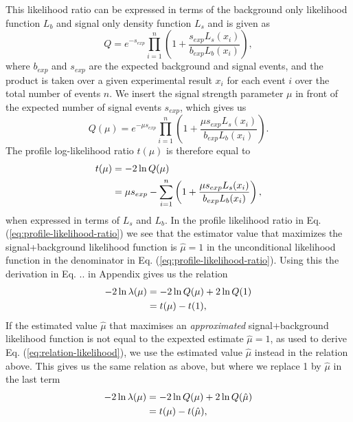 \documentclass[../../main/main.tex]{subfiles}
\begin{document}
This likelihood ratio can be expressed in terms of the background only likelihood function \(L_b\) and signal only density function \(L_s\) and is given as \cite{Read:2000ru}
\begin{equation}
  \label{eq:discovery-likelihood-ratio-s-b}
  Q = e^{-s_{exp}}\prod_{i=1}^n\left(1+\frac{s_{exp}L_s(x_i)}{b_{exp}L_b(x_i)}\right),
\end{equation}
where \(b_{exp}\) and \(s_{exp}\) are the expected background and signal events, and the product is taken over a given experimental result \(x_i\) for each event \(i\) over the total number of events \(n\). We insert the signal strength parameter \(\mu\) in front of the expected number of signal events \(s_{exp}\), which gives us
\begin{equation}
  \label{eq:discovery-likelihood-ratio-mu}
  Q(\mu) = e^{-\mu s_{exp}}\prod_{i=1}^n\left(1+\frac{\mu s_{exp}L_s(x_i)}{b_{exp}L_b(x_i)}\right).
\end{equation}
The profile log-likelihood ratio \(t(\mu)\) is therefore equal to
\begin{align}
  \label{eq:discovery-likelihood-ratio-mu}
  t(\mu) &= -2\ln Q(\mu) \notag \\
  &= \mu s_{exp} - \sum_{i=1}^n\left(1+ \frac{\mu s_{exp}L_s(x_i)}{b_{exp}L_b(x_i)}\right),
\end{align}
when expressed in terms of \(L_s\) and \(L_b\). In the profile likelihood ratio in Eq. (\ref{eq:profile-likelihood-ratio}) we see that the estimator value that maximizes the signal+background likelihood function is \(\hat{\mu}=1\) in the unconditional likelihood function in the denominator in Eq. (\ref{eq:profile-likelihood-ratio}). Using this the derivation in Eq. .. in Appendix gives us the relation
\begin{align}
  -2\ln \lambda(\mu) &= -2\ln Q(\mu) + 2\ln Q(1) \notag \\
             &= t(\mu) - t(1),   \label{eq:relation-likelihood}
\end{align}
If the estimated value \(\hat{\mu}\) that maximises an \emph{approximated} signal+background likelihood function is not equal to the expexted estimate \(\hat{\mu} = 1\), as used to derive Eq. (\ref{eq:relation-likelihood}), we use the estimated value \(\hat{\mu}\) instead in the relation above. This gives us the same relation as above, but where we replace 1 by \(\hat{\mu}\) in the last term
\begin{align}
  -2\ln \lambda(\mu) &= -2\ln Q(\mu) + 2\ln Q(\hat{\mu}) \notag \\
             &= t(\mu) - t(\hat{\mu}),   \label{eq:relation-likelihood-approx}
\end{align}
\end{document}
